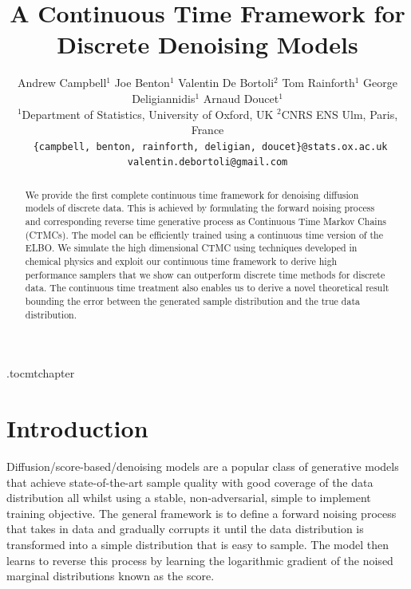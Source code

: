 \documentclass{article}
\title{A Continuous Time Framework for Discrete Denoising Models}
\author{%
  Andrew Campbell$^1$
  \And 
  Joe Benton$^1$
  \And
  Valentin De Bortoli$^2$
  \AND
  Tom Rainforth$^1$
  \And
  George Deligiannidis$^1$
  \And
  Arnaud Doucet$^1$
  \Affiliation\\
  $^1$Department of Statistics, University of Oxford, UK \quad $^2$CNRS ENS Ulm, Paris, France\\
  \texttt{ \{campbell, benton, rainforth, deligian, doucet\}@stats.ox.ac.uk}\\
  \texttt{valentin.debortoli@gmail.com}
}
\begin{document}
\etocdepthtag.toc{mtchapter}


\maketitle


\newcommand{\dt}{\Delta t}
\newcommand{\xdt}{\tilde{x}}
\newcommand{\xt}{x}
\newcommand{\E}{\mathbb{E}}
\newcommand{\KL}{\text{KL}}
\newcommand{\Dd}{1:D \backslash d}
\newcommand{\pdata}{p_{\textup{data}}}
\newcommand{\pref}{p_{\textrm{ref}}}
\newcommand{\LCT}{\mathcal{L}_{\textup{CT}}}
\newcommand{\LDT}{\mathcal{L}_{\textup{DT}}}
\newcommand{\LeCT}{\mathcal{L}_{\textup{eCT}}}
\newtheorem{theorem}{Theorem}
\newtheorem{proposition}{Proposition}
\newenvironment{talign}
 {\let\displaystyle\textstyle\align}
 {\endalign}

\maketitle
\begin{abstract}
We provide the first complete continuous time framework for denoising diffusion models of discrete data. This is achieved by formulating the forward noising process and corresponding reverse time generative process as Continuous Time Markov Chains (CTMCs). The model can be efficiently trained using a continuous time version of the ELBO. We simulate the high dimensional CTMC using techniques developed in chemical physics and exploit our continuous time framework to derive high performance samplers that we show can outperform discrete time methods for discrete data. The continuous time treatment also enables us to derive a novel theoretical result bounding the error between the generated sample distribution and the true data distribution.



\end{abstract}

\section{Introduction}

Diffusion/score-based/denoising models \cite{sohl2015deep, song2019generative, ho2020denoising, song2020score} are a popular class of generative models that achieve state-of-the-art sample quality with good coverage of the data distribution \cite{dhariwal2021diffusion} all whilst using a stable, non-adversarial, simple to implement training objective. The general framework is to define a forward noising process that takes in data and gradually corrupts it until the data distribution is transformed into a simple distribution that is easy to sample. The model then learns to reverse this process by learning the logarithmic gradient of the noised marginal distributions known as the score.
\end{document}
